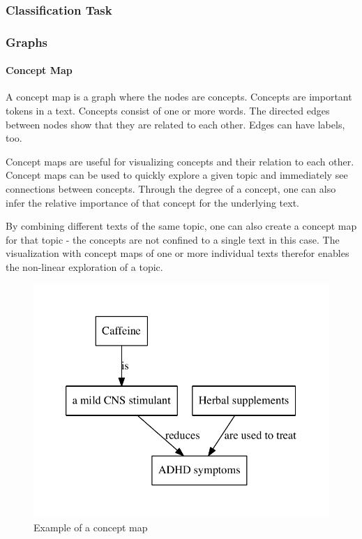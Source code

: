 

\subsubsection{Classification Task}

\subsubsection{Graphs}

\paragraph{Concept Map}
A concept map is a graph where the nodes are concepts.
Concepts are important tokens in a text.
Concepts consist of one or more words.
The directed edges between nodes show that they are related to each other.
Edges can have labels, too.

Concept maps are useful for visualizing concepts and their relation to each other.
Concept maps can be used to quickly explore a given topic and immediately see connections between concepts.
Through the degree of a concept, one can also infer the relative importance of that concept for the underlying text.

By combining different texts of the same topic, one can also create a concept map for that topic - the concepts are not confined to a single text in this case.
The visualization with concept maps of one or more individual texts therefor enables the non-linear exploration of a topic.


\begin{figure}[h]
\centering
\includegraphics[width=0.5\linewidth]{assets/figures/concept_map.pdf}
\caption{Example of a concept map}
\label{fig:concept_map}
\end{figure}

